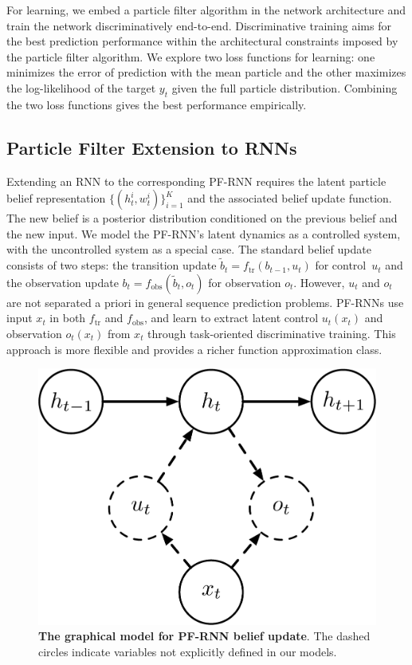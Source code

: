 \documentclass[letterpaper]{article} %
\begin{document}
For learning, we embed a particle filter algorithm in the network architecture and train the network \textrm{discriminatively} end-to-end. Discriminative training aims for the best prediction performance within the architectural constraints imposed by the particle filter algorithm. 
We explore two  loss functions for learning: 
one minimizes the error of prediction with the mean particle and the other maximizes the log-likelihood of
the target $y_t$ given the full particle distribution.
Combining the two loss functions gives the best performance empirically.

\subsection{Particle Filter Extension to RNNs}\label{sec:extension}

Extending an RNN to the corresponding PF-RNN requires  the latent particle belief representation $\{ (h_t^i,w_t^i) \}_{i=1}^K$ and  the  associated belief update function. 
The new belief  is a posterior distribution conditioned on the previous belief  and the new input.  We model the PF-RNN's latent dynamics as a controlled system, with the uncontrolled system as a special case. The standard belief update consists of two steps:  the transition update  $\tilde{b}_t = f_\mathrm{tr}(b_{t-1}, u_t)$ for control~$u_t$ and the observation update  $b_t = f_\mathrm{obs}(\tilde{b}_t, o_t)$ for observation $o_t$. However,  $u_t$ and $o_t$ are not separated a priori in general sequence prediction problems.
PF-RNNs use input $x_t$ in both $f_\mathrm{tr}$ and $f_\mathrm{obs}$, and learn to extract latent control $u_t(x_t)$ and observation $o_t(x_t)$ from $x_t$ through task-oriented discriminative training.
This approach is more flexible and provides a richer function approximation class.  
\begin{figure}[!htb]
	\centering
	\includegraphics[width=0.5\linewidth]{figs/brief_diagram.pdf}
	\centering
	\caption{%
		\textbf{The graphical model for PF-RNN belief  update}. The dashed circles indicate variables not explicitly defined in our models. 
	}
	\label{fig:diagram}
\end{figure}
\end{document}
